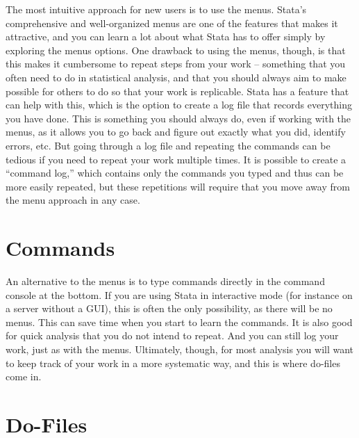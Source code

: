 \documentclass[]{book}
\begin{document}
The most intuitive approach for new users is to use the menus. Stata's comprehensive and well-organized menus are one of the features that makes it attractive, and you can learn a lot about what Stata has to offer simply by exploring the menus options. One drawback to using the menus, though, is that this makes it cumbersome to repeat steps from your work -- something that you often need to do in statistical analysis, and that you should always aim to make possible for others to do so that your work is replicable. Stata has a feature that can help with this, which is the option to create a log file that records everything you have done. This is something you should always do, even if working with the menus, as it allows you to go back and figure out exactly what you did, identify errors, etc. But going through a log file and repeating the commands can be tedious if you need to repeat your work multiple times. It is possible to create a ``command log,'' which contains only the commands you typed and thus can be more easily repeated, but these repetitions will require that you move away from the menu approach in any case.

\hypertarget{commands}{%
\section{Commands}\label{commands}}

An alternative to the menus is to type commands directly in the command console at the bottom. If you are using Stata in interactive mode (for instance on a server without a GUI), this is often the only possibility, as there will be no menus. This can save time when you start to learn the commands. It is also good for quick analysis that you do not intend to repeat. And you can still log your work, just as with the menus. Ultimately, though, for most analysis you will want to keep track of your work in a more systematic way, and this is where do-files come in.

\hypertarget{do-files}{%
\section{Do-Files}\label{do-files}}
\end{document}
